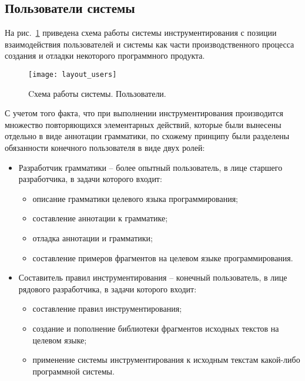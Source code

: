 \subsection{Пользователи системы}

На рис.~\ref{fig:layout_users} приведена схема работы системы инструментирования с позиции взаимодействия пользователей и системы как части производственного процесса создания и отладки некоторого программного продукта.

\begin{figure}[!h]
	\centering
	\texttt{[image: layout\_users]}
	\caption{Cхема работы системы. Пользователи.}
	\label{fig:layout_users}
\end{figure}

С учетом того факта, что при выполнении инструментирования производится множество повторяющихся элементарных действий, которые были вынесены отдельно в виде аннотации грамматики, по схожему принципу были разделены обязанности конечного пользователя в виде двух ролей:
\begin{itemize}[noitemsep]
  \item Разработчик грамматики -- более опытный пользователь, в лице старшего разработчика, в задачи которого входит:
    \begin{itemize}[noitemsep]
      \item описание грамматики целевого языка программирования;
      \item составление аннотации к грамматике;
      \item отладка аннотации и грамматики;
      \item составление примеров фрагментов на целевом языке программирования.
    \end{itemize}

  \item Составитель правил инструментирования -- конечный пользователь, в лице рядового разработчика, в задачи которого входит:
    \begin{itemize}[noitemsep]
      \item составление правил инструментирования;
      \item создание и пополнение библиотеки фрагментов исходных текстов на целевом языке;
      \item применение системы инструментирования к исходным текстам какой-либо программной системы.
    \end{itemize}
\end{itemize}

